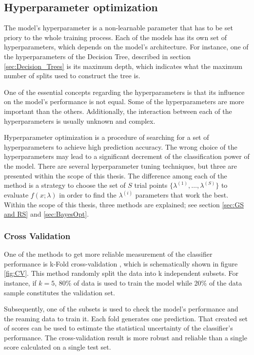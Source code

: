 \subsection{Hyperparameter optimization}
\label{sec:hyperparameters}

The model's hyperparameter is a non-learnable parameter that has to be set priory to the whole training process. Each of the models has its own set of hyperparameters, which depends on the model's architecture. For instance, one of the hyperparameters of the Decision Tree, described in section \ref{sec:Decision_Trees} is its maximum depth, which indicates what the maximum number of splits used to construct the tree is. 

One of the essential concepts regarding the hyperparameters is that its influence on the model's performance is not equal. Some of the hyperparameters are more important than the others. Additionally, the interaction between each of the hyperparameters is usually unknown and complex. 

Hyperparameter optimization is a procedure of searching for a set of hyperparameters to achieve high prediction accuracy. The wrong choice of the hyperparameters may lead to a significant decrement of the classification power of the model. There are several hyperparameter tuning techniques, but three are presented within the scope of this thesis. The difference among each of the method is a strategy to choose the set of $S$ trial points $\{\lambda^{(1)}, \ldots , \lambda^{(S)} \}$ to evaluate $f(x;\lambda)$ in order to find the $\lambda^{(i)}$ parameters that work the best. Within the scope of this thesis, three methods are explained; see section \ref{sec:GS and RS} and \ref{sec:BayesOpt}.  

\subsubsection{Cross Validation}
One of the methods to get more reliable measurement of the classifier performance is k-Fold cross-validation \cite{Statistical_Methods}, which is schematically shown in figure \ref{fig:CV}. 
This method randomly split the data into k independent subsets. For instance, if $k = 5$, 80\% of data is used to train the model while 20\% of the data sample constitutes the validation set.   

Subsequently, one of the subsets is used to check the model's performance and the reaming data to train it. Each fold generates one prediction. That created set of scores can be used to estimate the statistical uncertainty of the classifier's performance. The cross-validation result is more robust and reliable than a single score calculated on a single test set.   

